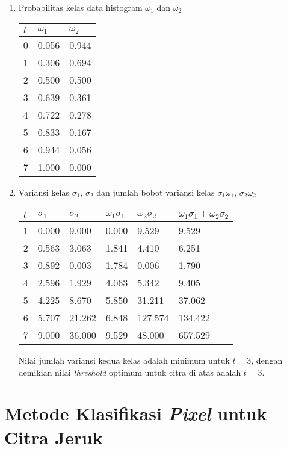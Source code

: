 \documentclass[laporan.tex]{subfiles}
\begin{document}
\begin{enumerate}
\item Probabilitas kelas data histogram $\omega_1$ dan $\omega_2$ \\
\begin{tabular}{|l|l|l|}
\hline
$t$ & $\omega_1$ & $\omega_2$ \\
\hline
0 &  0.056 & 0.944 \\
1 &  0.306 & 0.694 \\
2 &  0.500 & 0.500 \\
3 &  0.639 & 0.361 \\
4 &  0.722 & 0.278 \\
5 &  0.833 & 0.167 \\
6 &  0.944 & 0.056 \\
7 &  1.000 & 0.000 \\
\hline
\end{tabular}

\item Variansi kelas $\sigma_1$, $\sigma_2$ dan jumlah bobot variansi kelas $\sigma_1 \omega_1$, $\sigma_2 \omega_2$ \\
\begin{tabular}{|l|l|l|l|l|l|}
\hline
$t$ & $\sigma_1$ & $\sigma_2$ & $\omega_1 \sigma_1$ & $\omega_2 \sigma_2$ & $\omega_1 \sigma_1 + \omega_2 \sigma_2$ \\
\hline
1 & 0.000 & 9.000 & 0.000 & 9.529 & 9.529 \\
2 & 0.563 & 3.063 & 1.841 & 4.410 & 6.251 \\
3 & 0.892 & 0.003 & 1.784 & 0.006 & 1.790 \\
4 & 2.596 & 1.929 & 4.063 & 5.342 & 9.405 \\
5 & 4.225 & 8.670 & 5.850 & 31.211 & 37.062 \\
6 & 5.707 & 21.262 & 6.848 & 127.574 & 134.422 \\
7 & 9.000 & 36.000 & 9.529 & 48.000 & 657.529 \\
\hline
\end{tabular}

Nilai jumlah variansi kedua kelas adalah minimum untuk $t=3$, dengan demikian nilai \emph{threshold} optimum untuk citra di atas adalah $t=3$.

\end{enumerate}


\section{Metode Klasifikasi \emph{Pixel} untuk Citra Jeruk}
\end{document}

